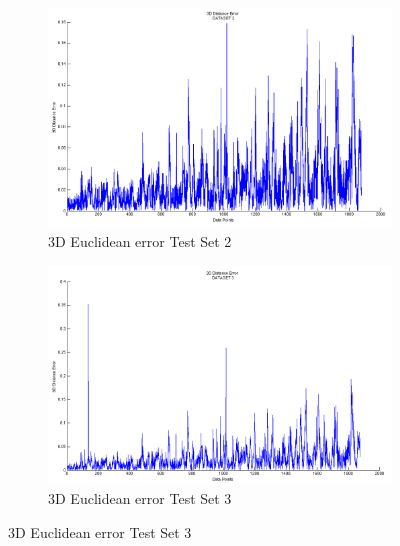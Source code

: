 \documentclass[15pt]{article}
\begin{document}
\begin{figure}[!htbp]
\centering
\begin{subfigure}{\columnwidth}
\includegraphics[width=\columnwidth]{T2}%
\caption{3D Euclidean error Test Set 2}%
\label{subfiga}%
\end{subfigure}\hfill%
\begin{subfigure}{\columnwidth}
\includegraphics[width=\columnwidth]{T3}%
\caption{3D Euclidean error Test Set 3}%
\label{subfiga}%
\end{subfigure}\hfill%
\end{figure}
\end{document}
